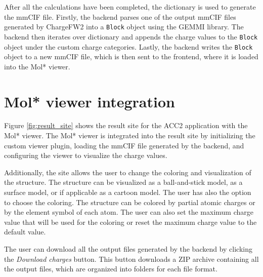 \documentclass[
  digital,     %
  oneside,     %
  nosansbold,  %
  nocolorbold, %
  lof,         %
  lot,         %
]{fithesis4}
\begin{document}
After all the calculations have been completed, the dictionary is used to generate the mmCIF file. Firstly, the backend parses one of the output mmCIF files generated by ChargeFW2 into a \texttt{Block} object using the GEMMI library. The backend then iterates over dictionary and appends the charge values to the \texttt{Block} object under the custom charge categories. Lastly, the backend writes the \texttt{Block} object to a new mmCIF file, which is then sent to the frontend, where it is loaded into the Mol* viewer.

\section{Mol* viewer integration}
\label{section:viewer_integration}

Figure \ref{fig:result_site} shows the result site for the ACC2 application with the Mol* viewer. The Mol* viewer is integrated into the result site by initializing the custom viewer plugin, loading the mmCIF file generated by the backend, and configuring the viewer to visualize the charge values.

Additionally, the site allows the user to change the coloring and visualization of the structure. The structure can be visualized as a ball-and-stick model, as a surface model, or if applicable as a cartoon model. The user has also the option to choose the coloring. The structure can be colored by partial atomic charges or by the element symbol of each atom. The user can also set the maximum charge value that will be used for the coloring or reset the maximum charge value to the default value.

The user can download all the output files generated by the backend by clicking the \textit{Download charges} button. This button downloads a ZIP archive containing all the output files, which are organized into folders for each file format.
\end{document}
